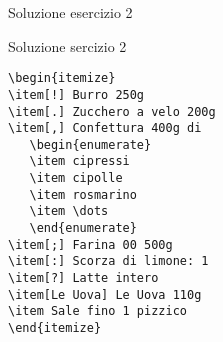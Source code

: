 \begin{frame}[fragile]{Soluzione esercizio 2}

\begin{soluzione}{Soluzione sercizio 2}
\begin{code}
\begin{verbatim}
\begin{itemize}
\item[!] Burro 250g
\item[.] Zucchero a velo 200g
\item[,] Confettura 400g di
   \begin{enumerate}
   \item cipressi
   \item cipolle
   \item rosmarino
   \item \dots
   \end{enumerate}
\item[;] Farina 00 500g
\item[:] Scorza di limone: 1
\item[?] Latte intero
\item[Le Uova] Le Uova 110g
\item Sale fino 1 pizzico
\end{itemize}
\end{verbatim}
\end{code}
\end{soluzione}

\end{frame}